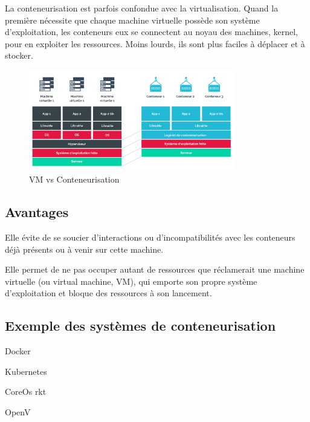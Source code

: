 La conteneurisation est parfois confondue avec la virtualisation. Quand la première nécessite que chaque machine virtuelle possède 
son système d’exploitation, les conteneurs eux se connectent au noyau des machines, kernel, pour en exploiter les ressources. 
Moins lourds, ils sont plus faciles à déplacer et à stocker. 
 \begin{figure}[H]
            \centering
                \includegraphics[width=0.8\textwidth]{Figures/virtualvscont}
	       \decoRule
		\caption[VM vs Conteneurisation]{VM vs Conteneurisation}
   \label{fig:VM vs Conteneurisation}
\end{figure}

\subsection{Avantages}
\begin{list}{•}
	\item Elle évite de se soucier d’interactions ou d’incompatibilités avec les conteneurs déjà présents ou à
	venir sur cette machine.
	\item 
	\item Elle permet de ne pas occuper autant de ressources que réclamerait une machine virtuelle (ou virtual machine, VM), qui emporte son propre système d’exploitation et bloque des ressources à son
	lancement.
\end{list}
\subsection{Exemple des systèmes de conteneurisation}
\begin{list}{•}
	\item Docker
	\item Kubernetes
	\item CoreOs rkt
	\item OpenV
\end{list}
